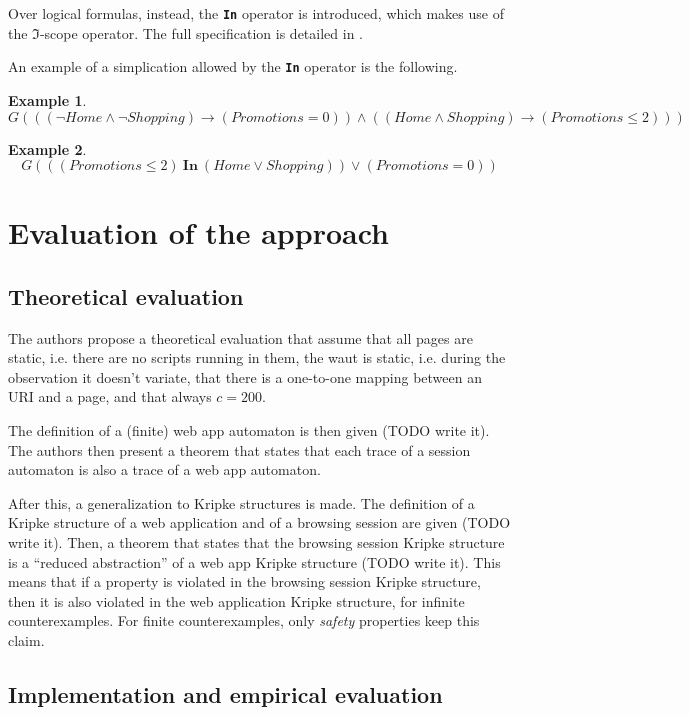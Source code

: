\documentclass[a4paper,10pt]{article}
\theoremstyle{plain} %
\theoremstyle{definition}
\newtheorem{example}{Example}[section]
\theoremstyle{remark}
\begin{document}
Over logical formulas, instead, the \textbf{\texttt{In}} operator is introduced, which makes use of the $\mathcal{\Im}$-scope operator. The full specification is detailed in \cite{Haydar2005}.

An example of a simplication allowed by the \textbf{\texttt{In}} operator is the following.

\begin{example}
  $$
  G(((\neg Home\land\neg Shopping) \rightarrow (Promotions = 0))\land ((Home\land Shopping) \rightarrow (Promotions \leq 2)))
  $$
\end{example}

\begin{example}
  \label{example:in-operator-simple}
  $$
  G(((Promotions \leq 2)\ \textbf{In}\ (Home\lor Shopping))\lor(Promotions=0))
  $$
\end{example}

\section{Evaluation of the approach}

\subsection{Theoretical evaluation}

The authors propose a theoretical evaluation that assume that all pages are static, i.e. there are no scripts running in them, the \gls{waut} is static, i.e. during the observation it doesn't variate, that there is a one-to-one mapping between an URI and a page, and that always $c = 200$.

The definition of a (finite) web app automaton is then given (TODO write it). The authors then present a theorem that states that each trace of a session automaton is also a trace of a web app automaton.

After this, a generalization to Kripke structures is made. The definition of a Kripke structure of a web application and of a browsing session are given (TODO write it). Then, a theorem that states that the browsing session Kripke structure is a ``reduced abstraction'' of a web app Kripke structure (TODO write it). This means that if a property is violated in the browsing session Kripke structure, then it is also violated in the web application Kripke structure, for infinite counterexamples. For finite counterexamples, only \textit{safety} properties keep this claim.

\subsection{Implementation and empirical evaluation}
\end{document}
